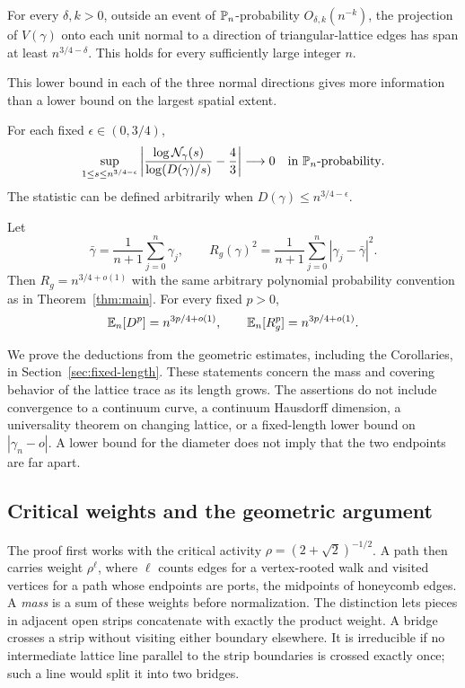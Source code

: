 \begin{corollary}\label{cor:directional-span}
For every \(\delta,k>0\), outside an event of \(\mathbb P_n\)-probability
\(O_{\delta,k}(n^{-k})\), the projection of \(V(\gamma)\) onto each
unit normal to a direction of triangular-lattice edges has span at least
\(n^{3/4-\delta}\). This holds for every sufficiently large integer \(n\).
\end{corollary}
This lower bound in each of the three normal directions gives more
information than a lower bound on the largest spatial extent.

\begin{corollary}\label{cor:dimension}
For each fixed $\epsilon\in(0,3/4)$,
\[
\sup_{1\le s\le n^{3/4-\epsilon}}
\left|\frac{\log\mathcal N_\gamma(s)}{\log(D(\gamma)/s)}-\frac43\right|
\longrightarrow0
\quad\hbox{in }\mathbb P_n\hbox{-probability}.
\]
The statistic can be defined arbitrarily when $D(\gamma)\le n^{3/4-\epsilon}$.
\end{corollary}

\begin{corollary}\label{cor:gyration}
Let
\[
\bar\gamma=\frac1{n+1}\sum_{j=0}^n\gamma_j,
\qquad R_g(\gamma)^2=\frac1{n+1}\sum_{j=0}^n|\gamma_j-\bar\gamma|^2.
\]
Then $R_g=n^{3/4+o(1)}$ with the same arbitrary polynomial probability convention as in Theorem~\ref{thm:main}. For every fixed $p>0$,
\[
\mathbb E_n[D^p]=n^{3p/4+o(1)},\qquad
\mathbb E_n[R_g^p]=n^{3p/4+o(1)}.
\]
\end{corollary}
We prove the deductions from the geometric estimates, including the Corollaries, in Section~\ref{sec:fixed-length}. These statements concern the mass and covering behavior of the lattice trace as its length grows. The assertions do not include convergence to a continuum curve, a continuum Hausdorff dimension, a universality theorem on changing lattice, or a fixed-length lower bound on $|\gamma_n-o|$. A lower bound for the diameter does not imply that the two endpoints are far apart.


\subsection{Critical weights and the geometric argument}
The proof first works with the critical activity
\(\rho=(2+\sqrt2)^{-1/2}\). A path then carries weight \(\rho^\ell\),
where \(\ell\) counts edges for a vertex-rooted walk and visited vertices
for a path whose endpoints are ports, the midpoints of honeycomb edges. A \emph{mass} is a sum of
these weights before normalization. The distinction lets pieces in
adjacent open strips concatenate with exactly the product weight.
A bridge crosses a strip without visiting either boundary elsewhere.
It is irreducible if no intermediate lattice line parallel to the strip
boundaries is crossed exactly once; such a line would split it into two
bridges.

